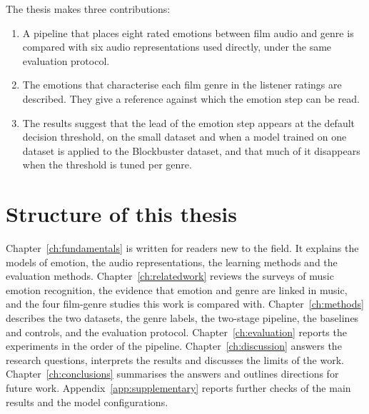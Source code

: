 The thesis makes three contributions:
\begin{enumerate}
  \item A pipeline that places eight rated emotions between film audio and genre is compared with six audio representations used directly, under the same evaluation protocol.
  \item The emotions that characterise each film genre in the listener ratings are described. They give a reference against which the emotion step can be read.
  \item The results suggest that the lead of the emotion step appears at the default decision threshold, on the small dataset and when a model trained on one dataset is applied to the Blockbuster dataset, and that much of it disappears when the threshold is tuned per genre.
\end{enumerate}

\section{Structure of this thesis}
\label{sec:structure}

Chapter~\ref{ch:fundamentals} is written for readers new to the field. It explains the
models of emotion, the audio representations, the learning methods and the evaluation
methods. Chapter~\ref{ch:relatedwork} reviews the surveys of music emotion
recognition, the evidence that emotion and genre are linked in music, and the four
film-genre studies this work is compared with. Chapter~\ref{ch:methods} describes the two
datasets, the genre labels, the two-stage pipeline, the baselines and controls, and the
evaluation protocol. Chapter~\ref{ch:evaluation} reports the experiments in the order
of the pipeline. Chapter~\ref{ch:discussion} answers the research questions, interprets the
results and discusses the limits of the work. Chapter~\ref{ch:conclusions} summarises the
answers and outlines directions for future work. Appendix~\ref{app:supplementary} reports further checks of the main results and the model configurations.
